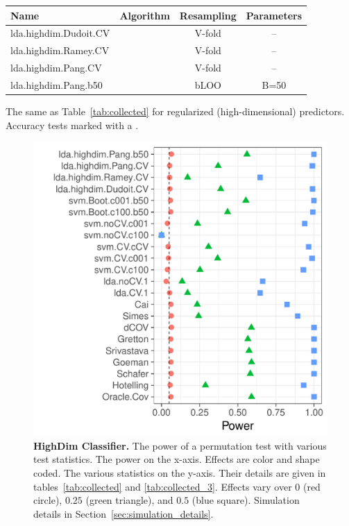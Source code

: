 \documentclass[]{bio}
\begin{document}
\bigskip

\begin{tcolorbox}
	\centering
	\footnotesize
	\begin{tabular}{l|c|c|c}
		Name & Algorithm & Resampling &  Parameters\\ 
		\hline
		\hline
		\cue lda.highdim.Dudoit.CV & \cite{dudoit_comparison_2002} & V-fold & -- \\ 
		\cue lda.highdim.Ramey.CV & \cite{ramey_high-dimensional_2016} & V-fold & -- \\ 
		\cue lda.highdim.Pang.CV & \cite{pang_shrinkage-based_2009} & V-fold & -- \\ 
		\cue lda.highdim.Pang.b50 & \cite{pang_shrinkage-based_2009} & bLOO 	 & B=50 \\ 
	\end{tabular} 
	\captionsetup{type=table}
	\caption{\footnotesize
		The same as Table~\ref{tab:collected} for regularized (high-dimensional) predictors. 
		Accuracy tests marked with a \cue.
	} 
	\label{tab:collected_3}
\end{tcolorbox}


\begin{figure}[ht]
	\centering
	\includegraphics[width=0.5\columnwidth]{"art/file14"}
	\caption{
		\textbf{HighDim Classifier.} 
		The power of a permutation test with various test statistics. 
		The power on the x-axis. 
		Effects are color and shape coded. 
		The various statistics on the y-axis. 
		Their details are given in tables~\ref{tab:collected} and \ref{tab:collected_3}. 
		Effects vary over $0$ (red circle), $0.25$ (green triangle), and $0.5$ (blue square). 
		Simulation details in Section~\ref{sec:simulation_details}.
	} 
	\label{fig:highdim}
\end{figure}
\end{document}
